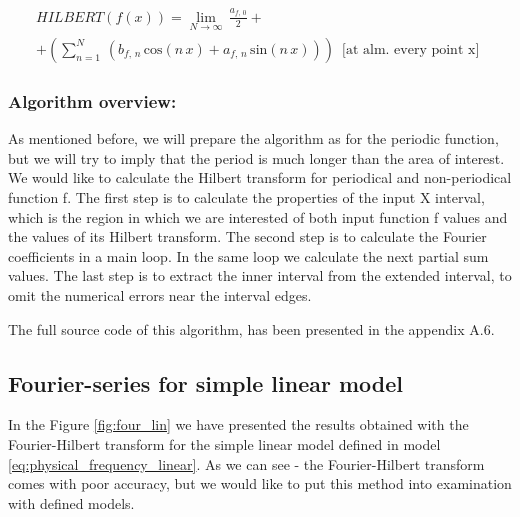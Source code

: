 \documentclass[12pt,twoside,a4paper]{article}
\numberwithin{equation}{subsection}
\numberwithin{figure}{subsection}
\begin{document}
\begin{multline} \label{eq:fourier_hilbert}
  HILBERT(f(x)) = \lim_{N\rightarrow \infty }\,\frac {{a_{f, \,0}}}{2} 
  + \\ + (\sum_{ n=1}^{N}\,({b_{f, \,n}}\,\mathrm{cos}(n\,x)
       + {a_{f, \,n}}\, \mathrm{sin}(n\,x)))
       \,\mbox{ [at alm. every point x] }
\end{multline}

\subsubsection*{Algorithm overview:}

As mentioned before, we will prepare the algorithm as for the periodic function, but we will try to imply that the period is much longer
than the area of interest. We would like to calculate the Hilbert transform for periodical and non-periodical function f. The first step is
to calculate the properties of the input X interval, which is the region in which we are interested of both input function f values and the
values of its Hilbert transform. The second step is to calculate the Fourier coefficients in a main loop. In the same loop we calculate the
next partial sum values. The last step is to extract the inner interval from the extended interval, to omit the numerical errors near the
interval edges.

The full source code of this algorithm, has been presented in the appendix A.6.

\subsection{Fourier-series for simple linear model} \label{chap:fourier_lin}

In the Figure \ref{fig:four_lin} we have presented the results obtained with the Fourier-Hilbert transform for the simple
linear model defined in model \ref{eq:physical_frequency_linear}. As we can see - the Fourier-Hilbert transform comes with poor accuracy,
but we would like to put this method into examination with defined models.
\end{document}
